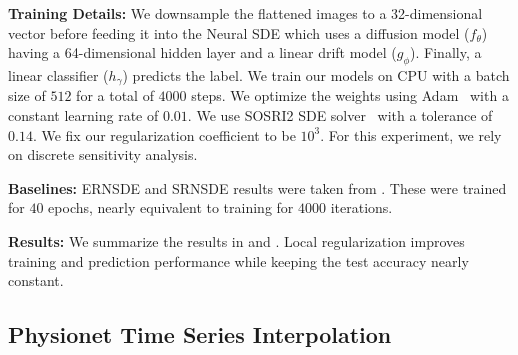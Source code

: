 \textbf{Training Details:} We downsample the flattened images to a 32-dimensional vector before feeding it into the Neural SDE which uses a diffusion model ($f_\theta$) having a 64-dimensional hidden layer and a linear drift model ($g_\phi$). Finally, a linear classifier ($h_\gamma$) predicts the label.
%
%
We train our models on CPU with a batch size of $512$ for a total of $4000$ steps. We optimize the weights using Adam~\citep{kingma2017adam} with a constant learning rate of $0.01$. We use SOSRI2 SDE solver~\citep{rackauckas2017adaptive} with a tolerance of $0.14$. We fix our regularization coefficient to be $10^3$. For this experiment, we rely on discrete sensitivity analysis.

\textbf{Baselines:} ERNSDE and SRNSDE results were taken from \citet{pal2021opening}. These were trained for $40$ epochs, nearly equivalent to training for $4000$ iterations.

\textbf{Results:} We summarize the results in  and . Local regularization improves training and prediction performance while keeping the test accuracy nearly constant.


\subsection{Physionet Time Series Interpolation}
\label{subsec:physionet}


